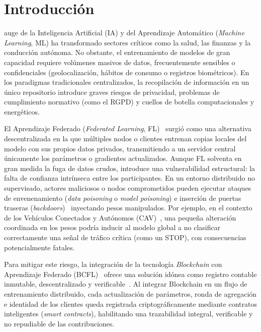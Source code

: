 \section{Introducción}
\label{sec:introduccion}

 auge de la Inteligencia Artificial (IA) y del Aprendizaje Automático (\textit{Machine Learning}, ML) ha transformado sectores críticos como la salud, las finanzas y la conducción autónoma. No obstante, el entrenamiento de modelos de gran capacidad requiere volúmenes masivos de datos, frecuentemente sensibles o confidenciales (geolocalización, hábitos de consumo o registros biométricos). En los paradigmas tradicionales centralizados, la recopilación de información en un único repositorio introduce graves riesgos de privacidad, problemas de cumplimiento normativo (como el RGPD) y cuellos de botella computacionales y energéticos.

El Aprendizaje Federado (\textit{Federated Learning}, FL)~\cite{mcmahan2017federated} surgió como una alternativa descentralizada en la que múltiples nodos o clientes entrenan copias locales del modelo con sus propios datos privados, transmitiendo a un servidor central únicamente los parámetros o gradientes actualizados. Aunque FL solventa en gran medida la fuga de datos crudos, introduce una vulnerabilidad estructural: la falta de confianza intrínseca entre los participantes. En un entorno distribuido no supervisado, actores maliciosos o nodos comprometidos pueden ejecutar ataques de envenenamiento (\textit{data poisoning} o \textit{model poisoning}) e inserción de puertas traseras (\textit{backdoors})~\cite{bagdasaryan2020backdoor} inyectando pesos manipulados. Por ejemplo, en el contexto de los Vehículos Conectados y Autónomos (CAV)~\cite{chellapandi2024federated}, una pequeña alteración coordinada en los pesos podría inducir al modelo global a no clasificar correctamente una señal de tráfico crítica (como un STOP), con consecuencias potencialmente fatales.

Para mitigar este riesgo, la integración de la tecnología \textit{Blockchain} con Aprendizaje Federado (BCFL)~\cite{qu2022blockchain} ofrece una solución idónea como registro contable inmutable, descentralizado y verificable~\cite{nakamoto2008bitcoin, zheng2018blockchain}. Al integrar Blockchain en un flujo de entrenamiento distribuido, cada actualización de parámetros, ronda de agregación e identidad de los clientes queda registrada criptográficamente mediante contratos inteligentes (\textit{smart contracts}), habilitando una trazabilidad integral, verificable y no repudiable de las contribuciones.

